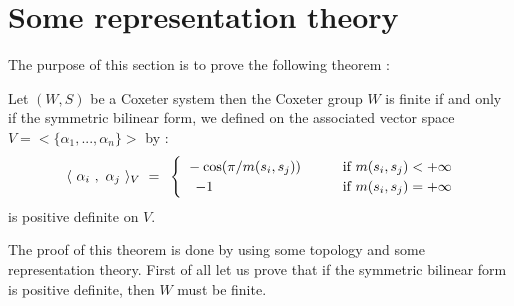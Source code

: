 
\section{Some representation theory}
The purpose of this section is to prove the following theorem :
\begin{theorem}\label{Le theorem W fini si et seulement si on  aun produit scalaire}
	Let $(W,S)$ be a Coxeter system then the Coxeter group $W$ is finite if and only if the symmetric bilinear form, we defined on the associated vector space  $V=<\{\alpha_1,...,\alpha_n\}>$ by :
	\begin{equation}
	\langle\text{ } \alpha_i\text{ },\text{ }\alpha_j\text{ }\rangle_V\text{ }=\text{ } \begin{cases}
	\text{ } -\cos(\pi/m(s_i,s_j))\quad\quad&\mbox{if }m(s_i,s_j)<+\infty\\
	\quad -1&\mbox{if }m(s_i,s_j)=+\infty
	\end{cases}
	\end{equation}
	is positive definite on $V$.
\end{theorem}
The proof of this theorem is done by using some topology and some representation theory. First of all let us prove that if the symmetric bilinear form is positive definite, then $W$ must be finite.

